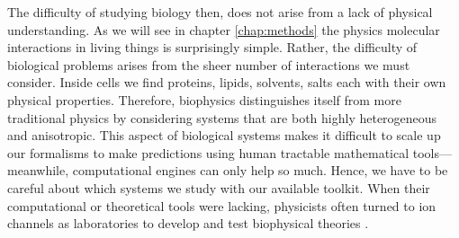 The difficulty of studying biology then, does not arise from a lack of physical understanding. As we will see in chapter \ref{chap:methods} the physics molecular interactions in living things is surprisingly simple. Rather, the difficulty of biological problems arises from the sheer number of interactions we must consider. Inside cells we find proteins, lipids, solvents, salts each with their own physical properties. Therefore, biophysics distinguishes itself from more traditional physics by considering systems that are both highly heterogeneous and anisotropic. This aspect of biological systems makes it difficult to scale up our formalisms to make predictions using human tractable mathematical tools---meanwhile, computational engines can only help so much. Hence, we have to be careful about which systems we study with our available toolkit. When their computational or theoretical tools were lacking, physicists often turned to ion channels as laboratories to develop and test biophysical theories \cite{moy2000, corry2000}.






